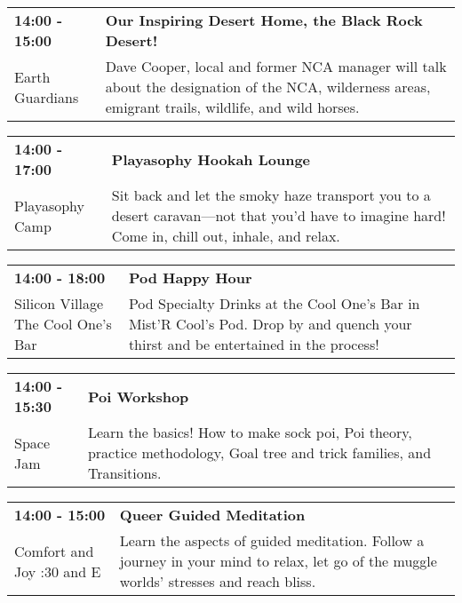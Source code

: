 \begin{tabular}{ p{1in} p{2.2in} }
    \textbf{14:00 - 15:00} & \textbf{Our Inspiring Desert Home, the Black Rock Desert!} \\
    Earth Guardians \newline  & Dave Cooper, local and former NCA manager will talk about the designation of the NCA, wilderness areas, emigrant trails, wildlife, and wild horses. \\
    \hline 
\end{tabular}
    
\begin{tabular}{ p{1in} p{2.2in} }
    \textbf{14:00 - 17:00} & \textbf{Playasophy Hookah Lounge} \\
    Playasophy Camp \newline  & Sit back and let the smoky haze transport you to a desert caravan---not that you'd have to imagine hard! Come in, chill out, inhale, and relax. \\
    \hline 
\end{tabular}
    
\begin{tabular}{ p{1in} p{2.2in} }
    \textbf{14:00 - 18:00} & \textbf{Pod Happy Hour} \\
    Silicon Village \newline The Cool One's Bar & Pod Specialty Drinks at the Cool One's Bar in Mist'R Cool's Pod.
Drop by and quench your thirst and be entertained in the process! \\
    \hline 
\end{tabular}
    
\begin{tabular}{ p{1in} p{2.2in} }
    \textbf{14:00 - 15:30} & \textbf{Poi Workshop} \\
    Space Jam \newline  & Learn the basics! How to make sock poi, Poi theory, practice methodology, Goal tree and trick families, and Transitions. \\
    \hline 
\end{tabular}
    
\begin{tabular}{ p{1in} p{2.2in} }
    \textbf{14:00 - 15:00} & \textbf{Queer Guided Meditation} \\
    Comfort and Joy \newline 7:30 and E & Learn the aspects of guided meditation.   Follow a journey in your mind to relax, let go of the muggle worlds' stresses and reach bliss. \\
    \hline 
\end{tabular}
    

